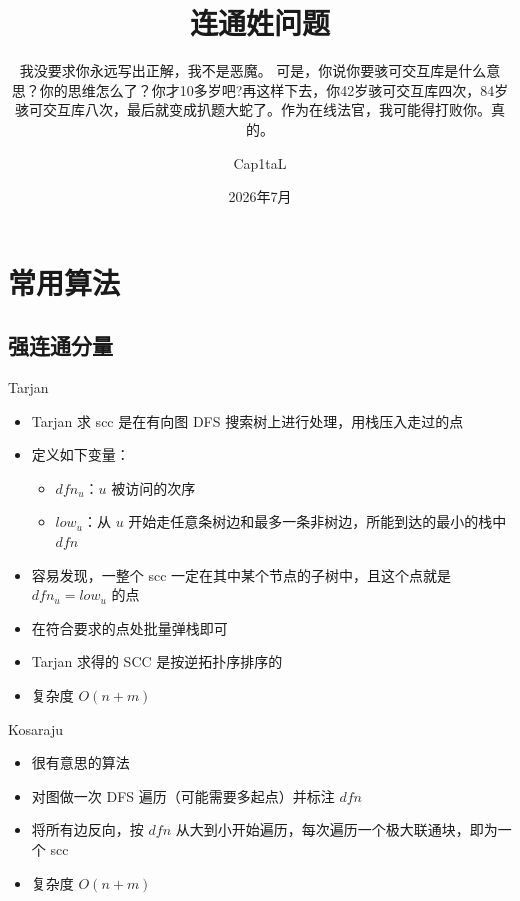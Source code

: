 ﻿\documentclass[aspectratio=169]{ctexbeamer}
\author{Cap1taL}
\title{连通姓问题}
\subtitle{我没要求你永远写出正解，我不是恶魔。 可是，你说你要骇可交互库是什么意思？你的思维怎么了？你才10多岁吧?再这样下去，你42岁骇可交互库四次，84岁骇可交互库八次，最后就变成扒题大蛇了。作为在线法官，我可能得打败你。真的。}
\date{2026年7月}
\begin{document}
\kaishu

\begin{frame}
    \titlepage
\end{frame}



\section{常用算法}

\subsection{强连通分量}
\begin{frame}{Tarjan}
    \begin{itemize}
        \item Tarjan 求 scc 是在有向图 DFS 搜索树上进行处理，用栈压入走过的点
        \item 定义如下变量：
        \begin{itemize}
            \item $dfn_u$：$u$ 被访问的次序
            \item $low_u$：从 $u$ 开始走任意条树边和最多一条非树边，所能到达的最小的栈中 $dfn$
        \end{itemize}
        \item 容易发现，一整个 scc 一定在其中某个节点的子树中，且这个点就是 $dfn_u=low_u$ 的点
        \item 在符合要求的点处批量弹栈即可
        \item Tarjan 求得的 SCC 是按逆拓扑序排序的
        \item 复杂度 $O(n+m)$
    \end{itemize}
\end{frame}

\begin{frame}{Kosaraju}
    \begin{itemize}
        \item 很有意思的算法
        \item 对图做一次 DFS 遍历（可能需要多起点）并标注 $dfn$
        \item 将所有边反向，按 $dfn$ 从大到小开始遍历，每次遍历一个极大联通块，即为一个 scc
        \item 复杂度 $O(n+m)$
    \end{itemize}
\end{frame}
\end{document}
